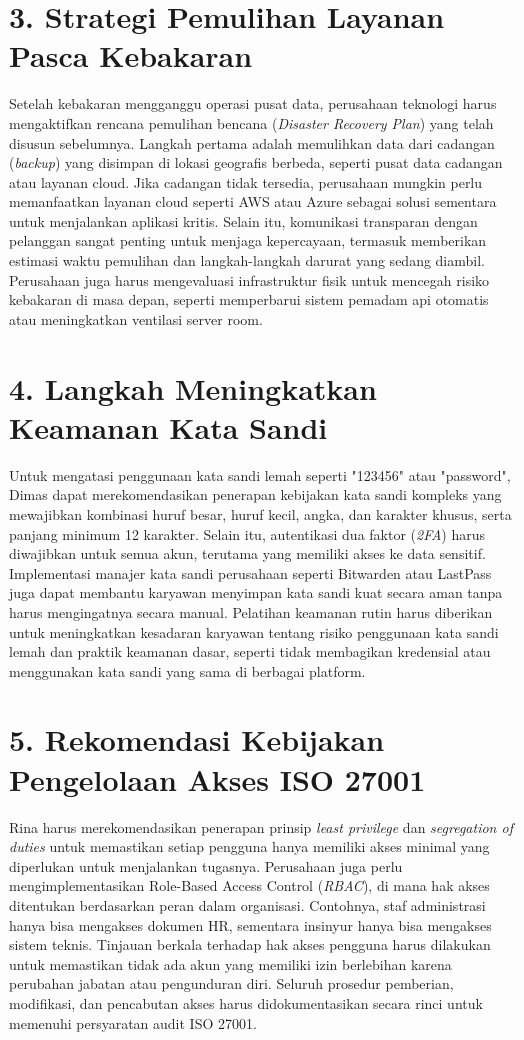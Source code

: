 \documentclass{article}
\begin{document}
\section*{3. Strategi Pemulihan Layanan Pasca Kebakaran}
Setelah kebakaran mengganggu operasi pusat data, perusahaan teknologi harus mengaktifkan rencana pemulihan bencana (\textit{Disaster Recovery Plan}) yang telah disusun sebelumnya. Langkah pertama adalah memulihkan data dari cadangan (\textit{backup}) yang disimpan di lokasi geografis berbeda, seperti pusat data cadangan atau layanan cloud. Jika cadangan tidak tersedia, perusahaan mungkin perlu memanfaatkan layanan cloud seperti AWS atau Azure sebagai solusi sementara untuk menjalankan aplikasi kritis. Selain itu, komunikasi transparan dengan pelanggan sangat penting untuk menjaga kepercayaan, termasuk memberikan estimasi waktu pemulihan dan langkah-langkah darurat yang sedang diambil. Perusahaan juga harus mengevaluasi infrastruktur fisik untuk mencegah risiko kebakaran di masa depan, seperti memperbarui sistem pemadam api otomatis atau meningkatkan ventilasi server room.

\section*{4. Langkah Meningkatkan Keamanan Kata Sandi}
Untuk mengatasi penggunaan kata sandi lemah seperti "123456" atau "password", Dimas dapat merekomendasikan penerapan kebijakan kata sandi kompleks yang mewajibkan kombinasi huruf besar, huruf kecil, angka, dan karakter khusus, serta panjang minimum 12 karakter. Selain itu, autentikasi dua faktor (\textit{2FA}) harus diwajibkan untuk semua akun, terutama yang memiliki akses ke data sensitif. Implementasi manajer kata sandi perusahaan seperti Bitwarden atau LastPass juga dapat membantu karyawan menyimpan kata sandi kuat secara aman tanpa harus mengingatnya secara manual. Pelatihan keamanan rutin harus diberikan untuk meningkatkan kesadaran karyawan tentang risiko penggunaan kata sandi lemah dan praktik keamanan dasar, seperti tidak membagikan kredensial atau menggunakan kata sandi yang sama di berbagai platform.

\section*{5. Rekomendasi Kebijakan Pengelolaan Akses ISO 27001}
Rina harus merekomendasikan penerapan prinsip \textit{least privilege} dan \textit{segregation of duties} untuk memastikan setiap pengguna hanya memiliki akses minimal yang diperlukan untuk menjalankan tugasnya. Perusahaan juga perlu mengimplementasikan Role-Based Access Control (\textit{RBAC}), di mana hak akses ditentukan berdasarkan peran dalam organisasi. Contohnya, staf administrasi hanya bisa mengakses dokumen HR, sementara insinyur hanya bisa mengakses sistem teknis. Tinjauan berkala terhadap hak akses pengguna harus dilakukan untuk memastikan tidak ada akun yang memiliki izin berlebihan karena perubahan jabatan atau pengunduran diri. Seluruh prosedur pemberian, modifikasi, dan pencabutan akses harus didokumentasikan secara rinci untuk memenuhi persyaratan audit ISO 27001.
\end{document}
